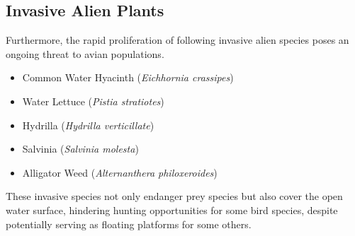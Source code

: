 \subsection{Invasive Alien Plants}
Furthermore, the rapid proliferation of following invasive alien species poses an ongoing threat to avian populations.

\begin{itemize}
\item Common Water Hyacinth (\textit{Eichhornia crassipes})
\item Water Lettuce (\textit{Pistia stratiotes})
\item Hydrilla (\textit{Hydrilla verticillate})
\item Salvinia (\textit{Salvinia molesta})
\item Alligator Weed (\textit{Alternanthera philoxeroides})
\end{itemize}
These invasive species not only endanger prey species but also cover the open water surface, hindering hunting opportunities for some bird species, despite potentially serving as floating platforms for some others.
